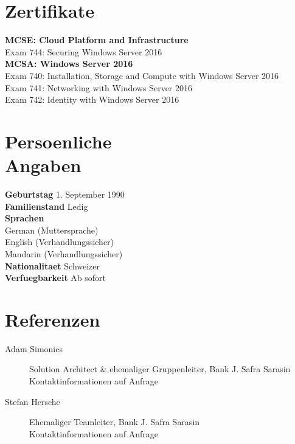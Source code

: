 \documentclass{cv}
\begin{document}
\begin{CJK*}{UTF8}{bsmi}
\section{Zertifikate}
\textbf{MCSE: Cloud Platform and Infrastructure}  \\ 
\hspace*{0.4cm}Exam 744: Securing Windows Server 2016 \\
\textbf{MCSA: Windows Server 2016}  \\ 
\hspace*{0.4cm}Exam 740: Installation, Storage and Compute with Windows Server 2016 \\
\hspace*{0.4cm}Exam 741: Networking with Windows Server 2016 \\
\hspace*{0.4cm}Exam 742: Identity with Windows Server 2016

\section{Persoenliche\\Angaben}
\textbf{Geburtstag} 1. September 1990\\
\textbf{Familienstand} Ledig\\
\textbf{Sprachen\\} 
\hspace*{0.4cm}German (Muttersprache)\\
\hspace*{0.4cm}English (Verhandlungssicher)\\
\hspace*{0.4cm}Mandarin (Verhandlungssicher)\\
\textbf{Nationalitaet} Schweizer \\
\textbf{Verfuegbarkeit} Ab sofort

\section{Referenzen}
\begin{description}
    \item[Adam Simonics] Solution Architect \& ehemaliger Gruppenleiter, Bank J. Safra Sarasin\\Kontaktinformationen auf Anfrage
    \item[Stefan Hersche] Ehemaliger Teamleiter, Bank J. Safra Sarasin\\Kontaktinformationen auf Anfrage
\end{description}

\end{CJK*}
\end{document}

